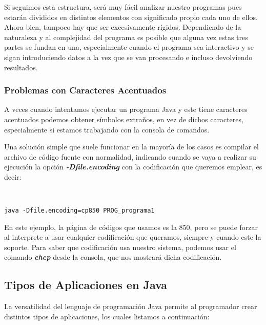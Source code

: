Si seguimos esta estructura, será muy fácil analizar nuestro programas pues estarán divididos en distintos elementos con significado propio cada uno de ellos. Ahora bien, tampoco hay que ser excesivamente rígidos. Dependiendo de la naturaleza y al complejidad del	programa es posible que alguna vez estas tres partes se fundan en una, especialmente cuando el programa sea interactivo y se sigan introduciendo datos a la vez que se van procesando e incluso devolviendo resultados.

\subsubsection{Problemas con Caracteres Acentuados}
A veces cuando intentamos ejecutar un programa Java y este tiene caracteres acentuados podemos obtener símbolos extraños, en vez de dichos caracteres, especialmente si estamos trabajando con la consola de comandos.

Una solución simple que suele funcionar en la mayoría de los casos es compilar el archivo de código fuente con normalidad, indicando cuando se vaya a realizar su ejecución la opción \textit{\textbf{-Dfile.encoding}} con la codificación que queremos emplear, es decir:


\begin{tcolorbox}[sharp corners, colback=yellow!30, colframe=white!20]
    \scriptsize
    \begin{verbatim}


java -Dfile.encoding=cp850 PROG_programa1
    \end{verbatim}
\end{tcolorbox}

En este ejemplo, la página de códigos que usamos es la 850, pero se puede forzar al interprete a usar cualquier codificación que queramos, siempre y cuando este la soporte. Para saber que codificación usa nuestro sistema, podemos usar el comando \textbf{\textit{chcp}} desde la consola, que nos mostrará dicha codificación.

\subsection{Tipos de Aplicaciones en Java}
La versatilidad del lenguaje de programación Java permite al programador crear distintos tipos de aplicaciones, los cuales listamos a continuación:

